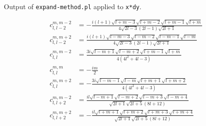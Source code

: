 \documentclass{amsart}
\begin{document}
\allowdisplaybreaks[4]

Output of {\tt expand-method.pl} applied to {\tt x*dy}.

\begin{align*}
c_{l,l-2}^{m,m-2} &= -\frac{i(l+1)\sqrt{l+m-3}\sqrt{l+m-2}\sqrt{l+m-1}\sqrt{l+m}}{4\sqrt{2l-3}(2l-1)\sqrt{2l+1}} \\
c_{l,l-2}^{m,m+2} &= \frac{i(l+1)\sqrt{l-m-3}\sqrt{l-m-2}\sqrt{l-m-1}\sqrt{l-m}}{4\sqrt{2l-3}(2l-1)\sqrt{2l+1}} \\
c_{l,l}^{m,m-2} &= \frac{3i\sqrt{l-m+1}\sqrt{l-m+2}\sqrt{l+m-1}\sqrt{l+m}}{4\left(4l^2+4l-3\right)} \\
c_{l,l}^{m,m} &= -\frac{im}{2} \\
c_{l,l}^{m,m+2} &= -\frac{3i\sqrt{l-m-1}\sqrt{l-m}\sqrt{l+m+1}\sqrt{l+m+2}}{4\left(4l^2+4l-3\right)} \\
c_{l,l+2}^{m,m-2} &= \frac{il\sqrt{l-m+1}\sqrt{l-m+2}\sqrt{l-m+3}\sqrt{l-m+4}}{\sqrt{2l+1}\sqrt{2l+5}(8l+12)} \\
c_{l,l+2}^{m,m+2} &= -\frac{il\sqrt{l+m+1}\sqrt{l+m+2}\sqrt{l+m+3}\sqrt{l+m+4}}{\sqrt{2l+1}\sqrt{2l+5}(8l+12)}
\end{align*}
\end{document}
